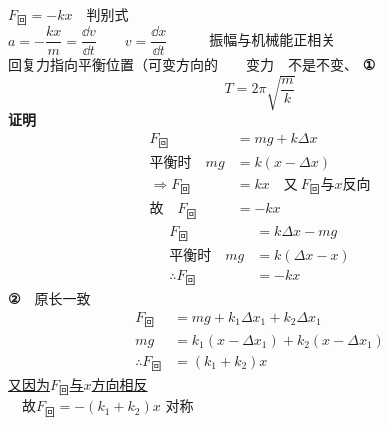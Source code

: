 \quad $F_{\text{回}}=-kx$　判别式\\[0.8ex]
$a=-\dfrac{kx}{m}=\dfrac{\dd v}{\dd t}$　　$v=\dfrac{\dd x}{\dd t}$　　　振幅与机械能正相关\\[0.8ex]
回复力指向平衡位置（可变方向的　　变力　不是不变、
\textbf{①}
\[
T=2\pi\sqrt{\dfrac{m}{k}}
\]
\textbf{证明}
\begin{align*}
F_{\text{回}}&=mg+k\Delta x\\
\text{平衡时}\quad mg&=k(x-\Delta x)\\
\Rightarrow F_{\text{回}}&=kx\quad\text{又}\ F_{\text{回}}\text{与}x\text{反向}\\
\text{故}\quad F_{\text{回}}&=-kx
\end{align*}
\begin{align*}
F_{\text{回}}&=k\Delta x-mg\\
\text{平衡时}\quad mg&=k(\Delta x-x)\\
\therefore F_{\text{回}}&=-kx
\end{align*}
\textbf{②}　原长一致
\begin{align*}
F_{\text{回}}&=mg+k_1\Delta x_1+k_2\Delta x_1\\
mg&=k_1(x-\Delta x_1)+k_2(x-\Delta x_1)\\
\therefore F_{\text{回}}&=(k_1+k_2)x
\end{align*}
\underline{又因为$F_{\text{回}}$与$x$方向相反}\\
　故$F_{\text{回}}=-(k_1+k_2)x$
对称　\ \ 
